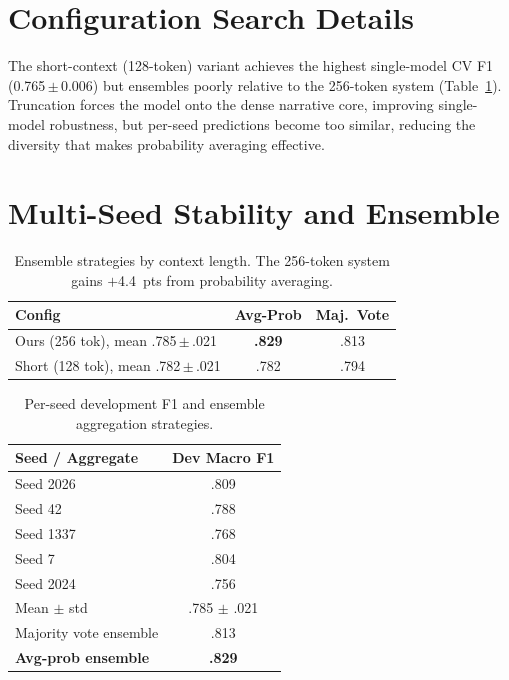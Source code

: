 \documentclass[11pt]{article}
\begin{document}
\section{Configuration Search Details}
\label{app:configs}

The short-context (128-token) variant achieves the highest single-model
CV F1 (0.765\,$\pm$\,0.006) but ensembles poorly relative to the
256-token system (Table~\ref{tab:ensemble}).
Truncation forces the model onto the dense narrative core, improving
single-model robustness, but per-seed predictions become too similar,
reducing the diversity that makes probability averaging effective.

\section{Multi-Seed Stability and Ensemble}
\label{app:ensemble}

\begin{table}[h]
\centering\small
\begin{tabular}{@{}lcc@{}}
\toprule
\textbf{Config} & \textbf{Avg-Prob} & \textbf{Maj.\ Vote} \\
\midrule
Ours (256 tok), mean .785\,$\pm$\,.021 & \textbf{.829} & .813 \\
Short (128 tok), mean .782\,$\pm$\,.021 & .782 & .794 \\
\bottomrule
\end{tabular}
\caption{Ensemble strategies by context length.
The 256-token system gains $+$4.4~pts from probability averaging.}
\label{tab:ensemble}
\end{table}

\begin{table}[h]
\centering\small
\begin{tabular}{@{}lc@{}}
\toprule
\textbf{Seed / Aggregate} & \textbf{Dev Macro F1} \\
\midrule
Seed 2026                  & .809 \\
Seed 42                    & .788 \\
Seed 1337                  & .768 \\
Seed 7                     & .804 \\
Seed 2024                  & .756 \\
\midrule
Mean $\pm$ std             & .785 $\pm$ .021 \\
Majority vote ensemble     & .813 \\
\textbf{Avg-prob ensemble} & \textbf{.829} \\
\bottomrule
\end{tabular}
\caption{Per-seed development F1 and ensemble aggregation strategies.}
\label{tab:seeds}
\end{table}
\end{document}
